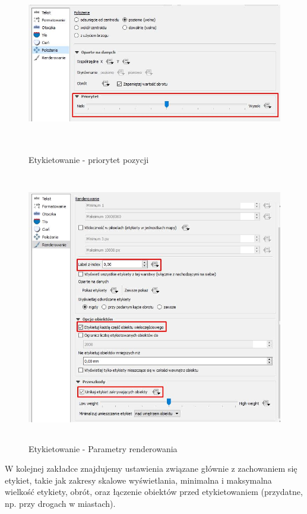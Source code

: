 \documentclass[12pt,a4paper]{book}
\begin{document}
\begin{center}
\begin{figure}
\includegraphics[width=17cm,height=7.832cm]{007-etykiety-priorytet.jpg}
\caption{Etykietowanie - priorytet pozycji}
\end{figure}
\end{center}


\begin{center}
\begin{figure}
\includegraphics[width=13cm,height=11.846cm]{007-etykiety-render.png}
\caption{Etykietowanie - Parametry renderowania}
\end{figure}
\end{center}
W kolejnej zakładce znajdujemy ustawienia związane głównie z zachowaniem się etykiet, takie jak zakresy skalowe wyświetlania, minimalna i maksymalna wielkość etykiety, obrót, oraz łączenie obiektów przed etykietowaniem (przydatne, np. przy drogach w miastach).
\end{document}
